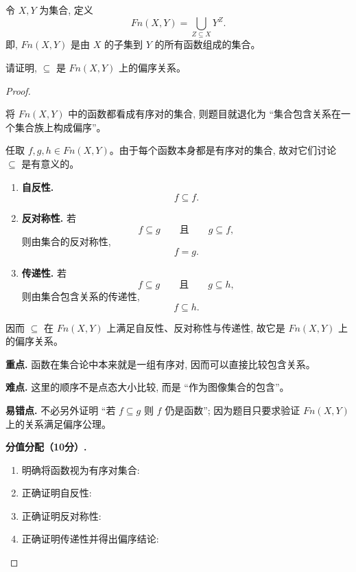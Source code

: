 \documentclass[a4paper, justified]{tufte-handout}
\begin{document}
\newpage
\begin{problem}[偏序]
  令 $X, Y$ 为集合, 定义
  \[
    Fn(X, Y) = \bigcup_{Z \subseteq X} Y^Z.
  \]
  即, $Fn(X, Y)$ 是由 $X$ 的子集到 $Y$ 的所有函数组成的集合。

  \noindent 请证明, $\subseteq$ 是 $Fn(X, Y)$ 上的偏序关系。
\end{problem}

\begin{proof}
  \begin{intention}
    将 $Fn(X, Y)$ 中的函数都看成有序对的集合, 则题目就退化为 ``集合包含关系在一个集合族上构成偏序''。
  \end{intention}

  任取 $f, g, h \in Fn(X, Y)$。由于每个函数本身都是有序对的集合, 故对它们讨论 $\subseteq$ 是有意义的。

  \begin{enumerate}[(1)]
    \item \textbf{自反性.}
      \[
        f \subseteq f.
      \]

    \item \textbf{反对称性.} 若
      \[
        f \subseteq g
        \qquad \text{且} \qquad
        g \subseteq f,
      \]
      则由集合的反对称性,
      \[
        f = g.
      \]

    \item \textbf{传递性.} 若
      \[
        f \subseteq g
        \qquad \text{且} \qquad
        g \subseteq h,
      \]
      则由集合包含关系的传递性,
      \[
        f \subseteq h.
      \]
  \end{enumerate}

  因而 $\subseteq$ 在 $Fn(X, Y)$ 上满足自反性、反对称性与传递性, 故它是 $Fn(X, Y)$ 上的偏序关系。

  \begin{remark}
    \textbf{重点.} 函数在集合论中本来就是一组有序对, 因而可以直接比较包含关系。\par
    \textbf{难点.} 这里的顺序不是点态大小比较, 而是 ``作为图像集合的包含''。\par
    \textbf{易错点.} 不必另外证明 ``若 $f \subseteq g$ 则 $f$ 仍是函数''; 因为题目只要求验证 $Fn(X,Y)$ 上的关系满足偏序公理。
  \end{remark}

  \textbf{分值分配（10分）.}
  \begin{enumerate}[(1)]
    \item 明确将函数视为有序对集合: 
    \item 正确证明自反性: 
    \item 正确证明反对称性: 
    \item 正确证明传递性并得出偏序结论: 
  \end{enumerate}
\end{proof}
\end{document}
